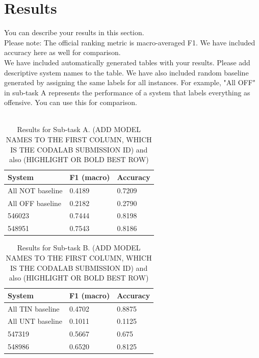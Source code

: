 \documentclass[11pt,a4paper]{article}
\begin{document}
\section{Results}
\label{sec:results}

You can describe your results in this section.
\\

Please note: The official ranking metric is macro-averaged F1. We have included accuracy here as well for comparison.
\\

We have included automatically generated tables with your results.
Please add descriptive system names to the table.
We have also included random baseline generated by assigning the same labels for all instances. For example, "All OFF" in sub-task A represents the performance of a system that labels everything as offensive. You can use this for comparison.
\\\\

\begin{table}[h]
\center
\begin{tabular}{|lll|}
\hline
\bf System & \bf F1 (macro) & \bf Accuracy \\ 
\hline
All NOT baseline & 0.4189 & 0.7209 \\
All OFF baseline & 0.2182 & 0.2790 \\
\hline
546023 & 0.7444 & 0.8198 \\
548951 & 0.7543 & 0.8186 \\
\hline
\end{tabular}
\caption{Results for Sub-task A. (ADD MODEL NAMES TO THE FIRST COLUMN, WHICH IS THE CODALAB SUBMISSION ID) and also (HIGHLIGHT OR BOLD BEST ROW)}
\label{tab:results-A-open}
\end{table}

\begin{table}[h]
\center
\begin{tabular}{|lll|}
\hline
\bf System & \bf F1 (macro) & \bf Accuracy \\ 
\hline
All TIN baseline & 0.4702 & 0.8875 \\
All UNT baseline & 0.1011 & 0.1125 \\
\hline
547319 & 0.5667 & 0.675 \\
548986 & 0.6520 & 0.8125 \\
\hline
\end{tabular}
\caption{Results for Sub-task B. (ADD MODEL NAMES TO THE FIRST COLUMN, WHICH IS THE CODALAB SUBMISSION ID) and also (HIGHLIGHT OR BOLD BEST ROW)}
\label{tab:results-B-open}
\end{table}
\end{document}

